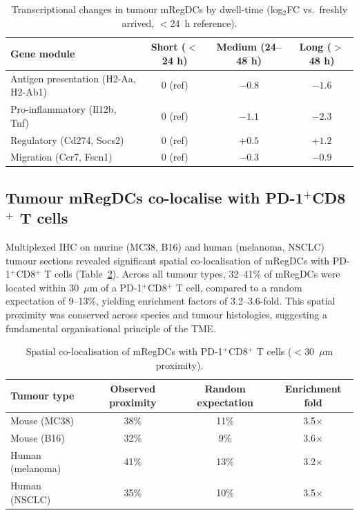\documentclass[11pt]{article}
\begin{document}
\begin{table}[htbp]
\centering
\caption{Transcriptional changes in tumour mRegDCs by dwell-time (log$_2$FC vs.\ freshly arrived, $<$24~h reference).}
\label{tab:temporal}
\begin{tabular}{@{}lccc@{}}
\toprule
Gene module & Short ($<$24 h) & Medium (24--48 h) & Long ($>$48 h) \\
\midrule
Antigen presentation (H2-Aa, H2-Ab1) & 0 (ref) & $-0.8$ & $-1.6$ \\
Pro-inflammatory (Il12b, Tnf)         & 0 (ref) & $-1.1$ & $-2.3$ \\
Regulatory (Cd274, Socs2)             & 0 (ref) & $+0.5$ & $+1.2$ \\
Migration (Ccr7, Fscn1)               & 0 (ref) & $-0.3$ & $-0.9$ \\
\bottomrule
\end{tabular}
\end{table}

\subsection{Tumour mRegDCs co-localise with PD-1$^{+}$CD8$^{+}$ T cells}

Multiplexed IHC on murine (MC38, B16) and human (melanoma, NSCLC) tumour sections revealed significant spatial co-localisation of mRegDCs with PD-1$^{+}$CD8$^{+}$ T cells (Table~\ref{tab:spatial}). Across all tumour types, 32--41\% of mRegDCs were located within 30~$\mu$m of a PD-1$^{+}$CD8$^{+}$ T cell, compared to a random expectation of 9--13\%, yielding enrichment factors of 3.2--3.6-fold. This spatial proximity was conserved across species and tumour histologies, suggesting a fundamental organisational principle of the TME.

\begin{table}[htbp]
\centering
\caption{Spatial co-localisation of mRegDCs with PD-1$^{+}$CD8$^{+}$ T cells ($<$30~$\mu$m proximity).}
\label{tab:spatial}
\begin{tabular}{@{}lccc@{}}
\toprule
Tumour type & Observed proximity & Random expectation & Enrichment fold \\
\midrule
Mouse (MC38)      & 38\% & 11\% & 3.5$\times$ \\
Mouse (B16)       & 32\% & 9\%  & 3.6$\times$ \\
Human (melanoma)  & 41\% & 13\% & 3.2$\times$ \\
Human (NSCLC)     & 35\% & 10\% & 3.5$\times$ \\
\bottomrule
\end{tabular}
\end{table}
\end{document}
